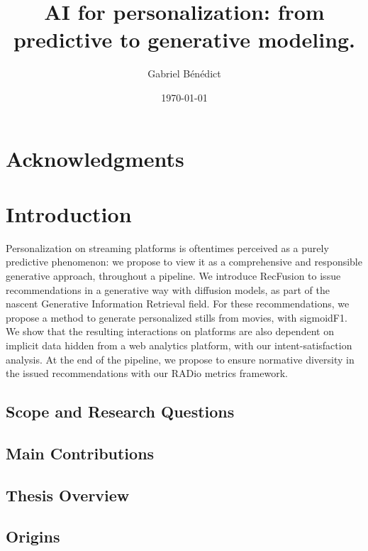 \documentclass[11pt]{book}
\author{Gabriel Bénédict}
\date{\today}
\title{AI for personalization: from predictive to generative modeling.}
\begin{document}
\maketitle
\tableofcontents
\chapter{Acknowledgments}
\chapter{Introduction}

Personalization on streaming platforms is oftentimes perceived as a purely predictive phenomenon: we propose to view it as a comprehensive and responsible generative approach, throughout a pipeline. We introduce RecFusion to issue recommendations in a generative way with diffusion models, as part of the nascent Generative Information Retrieval field. For these recommendations, we propose a method to generate personalized stills from movies, with sigmoidF1. We show that the resulting interactions on platforms are also dependent on implicit data hidden from a web analytics platform, with our intent-satisfaction analysis. At the end of the pipeline, we propose to ensure normative diversity in the issued recommendations with our RADio metrics framework.

\section{Scope and Research Questions}

\section{Main Contributions}

\section{Thesis Overview}

\section{Origins}
\end{document}
